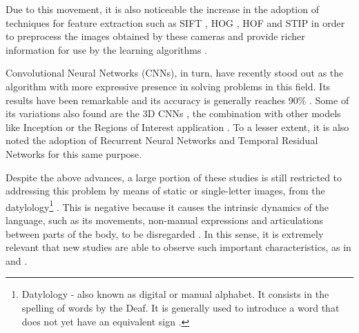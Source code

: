 Due to this movement, it is also noticeable the increase in the adoption of techniques for feature extraction such as SIFT \cite{lowe-2004}, HOG \cite{dalal-2005}, HOF \cite{laptev-2008} and STIP \cite{laptev-2008} in order to preprocess the images obtained by these cameras and provide richer information for use by the learning algorithms \cite{lim-2016, shanta-2018}.


Convolutional Neural Networks (CNNs), in turn, have recently stood out as the algorithm with more expressive presence in solving problems in this field. Its results have been remarkable and its accuracy is generally reaches 90\% \cite{shanta-2018, ji-2017, taskiran-2018, rao-2018}. Some of its variations also found are the 3D CNNs \cite{elbadawy-2017}, the combination with other models like Inception \cite{das-2018} or the Regions of Interest application \cite{sajanraj-2018}. To a lesser extent, it is also noted the adoption of Recurrent Neural Networks \cite{konstantinidis-2018} and Temporal Residual Networks \cite{pigou-2017} for this same purpose.



Despite the above advances, a large portion of these studies is still restricted to addressing this problem by means of static or single-letter images, from the datylology\footnote{
     Datylology - also known as digital or manual alphabet. It consists in the spelling of words by the Deaf. It is generally used to introduce a word that does not yet have an equivalent sign \cite{quadros-2004, pereira-choi-2011}.
} \cite{shanta-2018, taskiran-2018, elbadawy-2017, das-2018, sajanraj-2018}. This is negative because it causes the intrinsic dynamics of the language, such as its movements, non-manual expressions and articulations between parts of the body, to be disregarded \cite{quadros-2004}. In this sense, it is extremely relevant that new studies are able to observe such important characteristics, as in \cite{konstantinidis-2018} and \cite {pigou-2017}.


